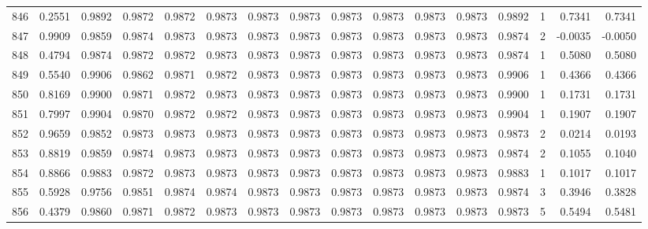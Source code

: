 \begin{tabular}{lrrrrrrrrrrrrrrr}
846 &      0.2551 &  0.9892 &  0.9872 &  0.9872 &  0.9873 &  0.9873 &  0.9873 &  0.9873 &  0.9873 &  0.9873 &   0.9873 &     0.9892 &      1 &                    0.7341 &                     0.7341 \\
847 &      0.9909 &  0.9859 &  0.9874 &  0.9873 &  0.9873 &  0.9873 &  0.9873 &  0.9873 &  0.9873 &  0.9873 &   0.9873 &     0.9874 &      2 &                   -0.0035 &                    -0.0050 \\
848 &      0.4794 &  0.9874 &  0.9872 &  0.9872 &  0.9873 &  0.9873 &  0.9873 &  0.9873 &  0.9873 &  0.9873 &   0.9873 &     0.9874 &      1 &                    0.5080 &                     0.5080 \\
849 &      0.5540 &  0.9906 &  0.9862 &  0.9871 &  0.9872 &  0.9873 &  0.9873 &  0.9873 &  0.9873 &  0.9873 &   0.9873 &     0.9906 &      1 &                    0.4366 &                     0.4366 \\
850 &      0.8169 &  0.9900 &  0.9871 &  0.9872 &  0.9873 &  0.9873 &  0.9873 &  0.9873 &  0.9873 &  0.9873 &   0.9873 &     0.9900 &      1 &                    0.1731 &                     0.1731 \\
851 &      0.7997 &  0.9904 &  0.9870 &  0.9872 &  0.9872 &  0.9873 &  0.9873 &  0.9873 &  0.9873 &  0.9873 &   0.9873 &     0.9904 &      1 &                    0.1907 &                     0.1907 \\
852 &      0.9659 &  0.9852 &  0.9873 &  0.9873 &  0.9873 &  0.9873 &  0.9873 &  0.9873 &  0.9873 &  0.9873 &   0.9873 &     0.9873 &      2 &                    0.0214 &                     0.0193 \\
853 &      0.8819 &  0.9859 &  0.9874 &  0.9873 &  0.9873 &  0.9873 &  0.9873 &  0.9873 &  0.9873 &  0.9873 &   0.9873 &     0.9874 &      2 &                    0.1055 &                     0.1040 \\
854 &      0.8866 &  0.9883 &  0.9872 &  0.9873 &  0.9873 &  0.9873 &  0.9873 &  0.9873 &  0.9873 &  0.9873 &   0.9873 &     0.9883 &      1 &                    0.1017 &                     0.1017 \\
855 &      0.5928 &  0.9756 &  0.9851 &  0.9874 &  0.9874 &  0.9873 &  0.9873 &  0.9873 &  0.9873 &  0.9873 &   0.9873 &     0.9874 &      3 &                    0.3946 &                     0.3828 \\
856 &      0.4379 &  0.9860 &  0.9871 &  0.9872 &  0.9873 &  0.9873 &  0.9873 &  0.9873 &  0.9873 &  0.9873 &   0.9873 &     0.9873 &      5 &                    0.5494 &                     0.5481 \\

\end{tabular}
